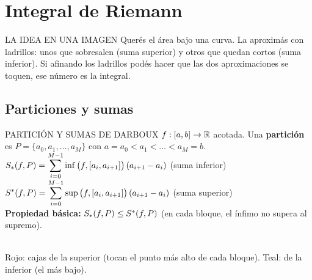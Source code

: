 \chapter{Integral de Riemann}

\begin{tip}{LA IDEA EN UNA IMAGEN}
Querés el área bajo una curva. La aproximás con ladrillos: unos que sobresalen (suma superior) y otros que quedan cortos (suma inferior). Si afinando los ladrillos podés hacer que las dos aproximaciones se toquen, ese número es la integral.
\end{tip}

\section{Particiones y sumas}
\apuntes
\begin{sello}{PARTICIÓN Y SUMAS DE DARBOUX}
$f:[a,b]\to\mathbb{R}$ acotada. Una \textbf{partición} es $P=\{a_0,a_1,\dots,a_M\}$ con $a=a_0<a_1<\dots<a_M=b$.\\[3pt]
$\displaystyle S_{*}(f,P)=\sum_{i=0}^{M-1}\inf\big(f,[a_i,a_{i+1}]\big)\,(a_{i+1}-a_i)$ \quad (suma inferior)\\[3pt]
$\displaystyle S^{*}(f,P)=\sum_{i=0}^{M-1}\sup\big(f,[a_i,a_{i+1}]\big)\,(a_{i+1}-a_i)$ \quad (suma superior)\\[3pt]
\textbf{Propiedad básica:} $S_{*}(f,P)\le S^{*}(f,P)$ (en cada bloque, el ínfimo no supera al supremo).
\end{sello}
\begin{center}
\\
{\ttfamily\scriptsize\color{suave} Rojo: cajas de la superior (tocan el punto más alto de cada bloque). Teal: de la inferior (el más bajo).}
\end{center}

